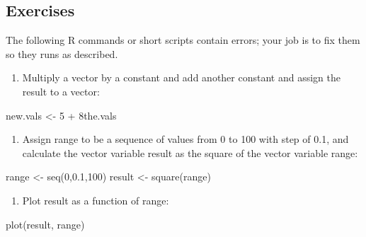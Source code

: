 \documentclass[
  letterpaper,
  DIV=11,
  numbers=noendperiod]{scrreprt}
\newenvironment{Shaded}{\begin{snugshade}}{\end{snugshade}}
\newcommand{\DecValTok}[1]{\textcolor[rgb]{0.68,0.00,0.00}{#1}}
\newcommand{\FloatTok}[1]{\textcolor[rgb]{0.68,0.00,0.00}{#1}}
\newcommand{\FunctionTok}[1]{\textcolor[rgb]{0.28,0.35,0.67}{#1}}
\newcommand{\NormalTok}[1]{\textcolor[rgb]{0.00,0.23,0.31}{#1}}
\newcommand{\OtherTok}[1]{\textcolor[rgb]{0.00,0.23,0.31}{#1}}
\newcommand{\SpecialCharTok}[1]{\textcolor[rgb]{0.37,0.37,0.37}{#1}}
\providecommand{\tightlist}{%
  \setlength{\itemsep}{0pt}\setlength{\parskip}{0pt}}\usepackage{longtable,booktabs,array}
\begin{document}
\hypertarget{exercises-5}{%
\subsection{Exercises}\label{exercises-5}}

The following R commands or short scripts contain errors; your job is to
fix them so they runs as described.

\begin{enumerate}
\def\labelenumi{\arabic{enumi}.}
\tightlist
\item
  Multiply a vector by a constant and add another constant and assign
  the result to a vector:
\end{enumerate}

\begin{Shaded}
\begin{Highlighting}[]
\NormalTok{new.vals }\OtherTok{\textless{}{-}} \DecValTok{5} \SpecialCharTok{+}\NormalTok{ 8the.vals}
\end{Highlighting}
\end{Shaded}

\begin{enumerate}
\def\labelenumi{\arabic{enumi}.}
\setcounter{enumi}{1}
\tightlist
\item
  Assign range to be a sequence of values from 0 to 100 with step of
  0.1, and calculate the vector variable result as the square of the
  vector variable range:
\end{enumerate}

\begin{Shaded}
\begin{Highlighting}[]
\NormalTok{range }\OtherTok{\textless{}{-}} \FunctionTok{seq}\NormalTok{(}\DecValTok{0}\NormalTok{,}\FloatTok{0.1}\NormalTok{,}\DecValTok{100}\NormalTok{)}
\NormalTok{result }\OtherTok{\textless{}{-}} \FunctionTok{square}\NormalTok{(range)}
\end{Highlighting}
\end{Shaded}

\begin{enumerate}
\def\labelenumi{\arabic{enumi}.}
\setcounter{enumi}{2}
\tightlist
\item
  Plot result as a function of range:
\end{enumerate}

\begin{Shaded}
\begin{Highlighting}[]
\FunctionTok{plot}\NormalTok{(result, range)}
\end{Highlighting}
\end{Shaded}
\end{document}
